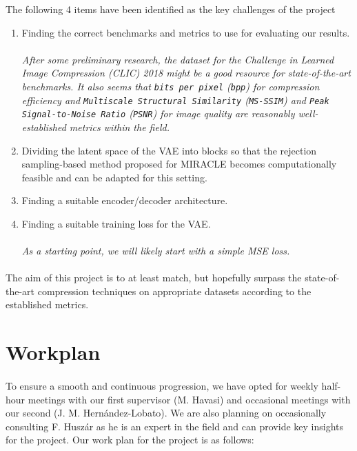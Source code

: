 \documentclass{article}
\begin{document}
The following 4 items have been identified as the key challenges of the project\footnotemark[1]
\begin{enumerate}
\item Finding the correct benchmarks and metrics to use for evaluating our
  results. \\ \\
  \textit{After some preliminary research, the dataset for the Challenge in
  Learned Image Compression (CLIC) 2018 \cite{clic2018} might be a good resource
  for state-of-the-art benchmarks. It also seems that \texttt{bits per pixel} (\texttt{bpp})
  for compression efficiency and \texttt{Multiscale Structural Similarity}
  (\texttt{MS-SSIM}) \cite{msssim} and \texttt{Peak Signal-to-Noise Ratio}
  (\texttt{PSNR}) \cite{psnr} for image quality are reasonably well-established
  metrics within the field.}

\item Dividing the latent space of the VAE into blocks so that the rejection
  sampling-based method proposed for MIRACLE becomes computationally feasible
  and can be adapted for this setting.
\item Finding a suitable encoder/decoder architecture.
\item Finding a suitable training loss for the VAE. \\ \\
  \textit{As a starting point, we will likely start with a simple MSE loss.}
\end{enumerate}
\paragraph{}
The aim of this project is to at least match, but hopefully surpass the
state-of-the-art compression techniques on appropriate datasets
according to the established metrics.

\section*{Workplan}
\paragraph{}
To ensure a smooth and continuous progression, we have opted for weekly
half-hour meetings with our first supervisor (M. Havasi) and occasional meetings
with our second (J. M. Hern\'andez-Lobato). We are also planning on occasionally
consulting F. Husz\'ar as he is an expert in the field and can provide key
insights for the project. Our
work plan for the project is as follows:
\end{document}
